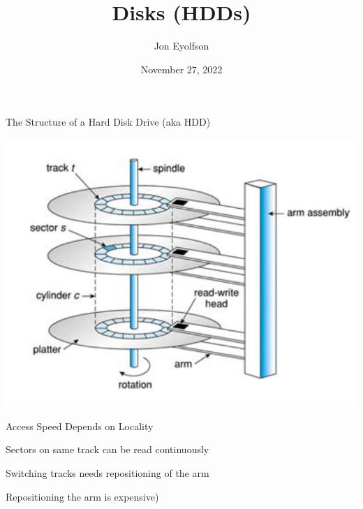 

\title{Disks (HDDs)}
\author{Jon Eyolfson}
\date{November 27, 2022}


  \begin{frame}
    \titlepage
  \end{frame}

  \begin{frame}{The Structure of a Hard Disk Drive (aka HDD)}
    \begin{center}
        \includegraphics[height=0.8\textheight]{hdd1.png}
    \end{center}
  \end{frame}

  \begin{frame}{Access Speed Depends on Locality}

    Sectors on same track can be read continuously

    \vspace{2em}

    Switching tracks needs repositioning of the arm

    \hspace{2em} Repositioning the arm is expensive)
  \end{frame}

